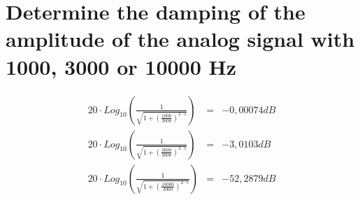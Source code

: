 \documentclass[a4wide,10pt]{article}
\begin{document}
\section{Determine the damping of the amplitude of the analog signal with 1000, 3000
or 10000 Hz} %
\label{sec:determine_the_damping_of_the_amplitude_of_the_analog_signal_with_1000_3000_or_10000_hz}
\begin{eqnarray}
	20 \cdot Log_{10}(\frac{1}{\sqrt{1+(\frac{1000}{3000})^{2\cdot 5}}}) &=& -0,00074dB \nonumber \\
	20 \cdot Log_{10}(\frac{1}{\sqrt{1+(\frac{3000}{3000})^{2\cdot 5}}}) &=& -3,0103dB \nonumber \\
	20 \cdot Log_{10}(\frac{1}{\sqrt{1+(\frac{10000}{3000})^{2\cdot 5}}}) &=& -52,2879dB \nonumber \\
\end{eqnarray}
\newpage
\end{document}
